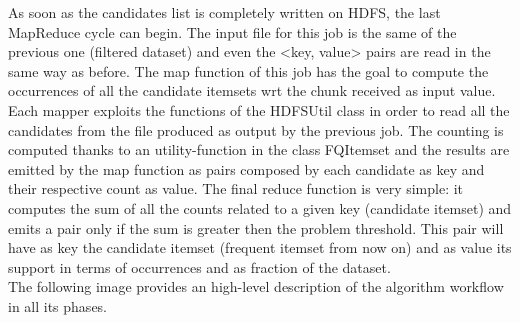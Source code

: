 \documentclass[]{report}
\begin{document}
	As soon as the candidates list is completely written on HDFS, the last MapReduce cycle can begin. The input file for this job is the same of the previous one (filtered dataset) and even the <key, value> pairs are read in the same way as before. The map function of this job has the goal to compute the occurrences of all the candidate itemsets wrt the chunk received as input value. Each mapper exploits the functions of the HDFSUtil class in order to read all the candidates from the file produced as output by the previous job. The counting is computed thanks to an utility-function in the class FQItemset and the results are emitted by the map function as pairs composed by each candidate as key and their respective count as value.  The final reduce function is very simple: it computes the sum of all the counts related to a given key (candidate itemset) and emits a pair only if the sum is greater then the problem threshold. This pair will have as key the candidate itemset (frequent itemset from now on) and as value its support in terms of occurrences and as fraction of the dataset. \\
	The following image provides an high-level description of the algorithm workflow in all its phases.
	\begin{figure}[h]
	\end{figure}
\end{document}
